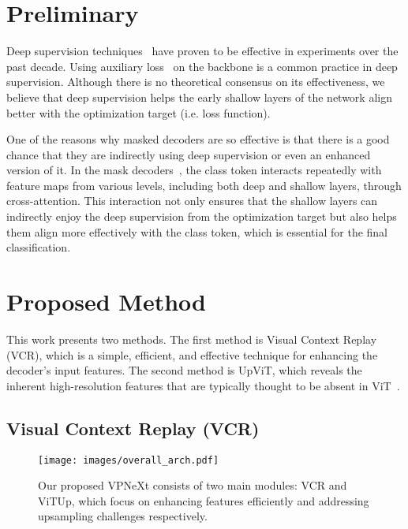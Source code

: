 \section{Preliminary}

Deep supervision techniques~\cite{cDeeplySupervisedNets,cDeepSupervisedCNN} have proven to be effective in experiments over the past decade.
%
Using auxiliary loss~\cite{cPSPNet,cDualAttention,cCAA} on the backbone is a common practice in deep supervision.
%
Although there is no theoretical consensus on its effectiveness, we believe that deep supervision helps the early shallow layers of the network align better with the optimization target (i.e. loss function).

One of the reasons why masked decoders are so effective is that there is a good chance that they are indirectly using deep supervision or even an enhanced version of it.
%
In the mask decoders~\cite{cMaXDeepLab,cKMaXDeepLab,cMask2Former}, the class token interacts repeatedly with feature maps from various levels, including both deep and shallow layers, through cross-attention. 
%
This interaction not only ensures that the shallow layers can indirectly enjoy the deep supervision from the optimization target but also helps them align more effectively with the class token, which is essential for the final classification.


\section{Proposed Method}
\label{sec:method}
This work presents two methods. 
The first method is Visual Context Replay (VCR), which is a simple, efficient, and effective technique for enhancing the decoder's input features. 
The second method is UpViT, which reveals the inherent high-resolution features that are typically thought to be absent in ViT~\cite{cViT}.

\subsection{Visual Context Replay (VCR)}

\begin{figure*}[t]
    \centering
    \texttt{[image: images/overall\_arch.pdf]}
    \caption{Our proposed VPNeXt consists of two main modules: VCR and ViTUp, which focus on enhancing features efficiently and addressing upsampling challenges respectively.}
    \label{fig:overall}
\end{figure*}

